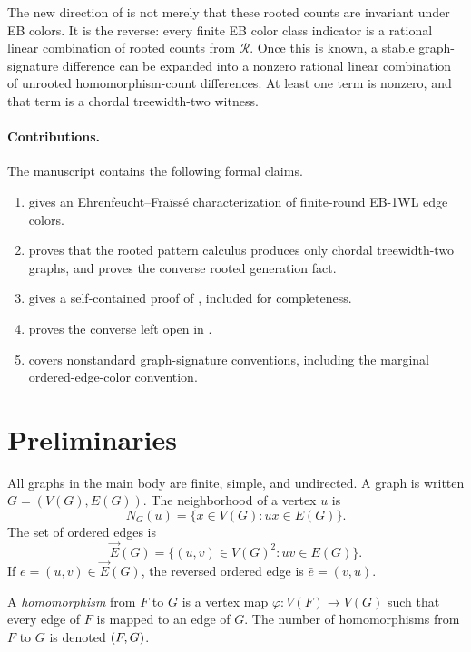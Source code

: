 \documentclass[11pt]{article}
\let\hom\relax
\DeclareMathOperator{\hom}{hom}
\newcommand{\cR}{\mathcal{R}}
\newcommand{\vecE}{\overrightarrow{E}}
\begin{document}
The new direction of  is not merely that these rooted counts are invariant under EB colors.  It is the reverse: every finite EB color class indicator is a rational linear combination of rooted counts from $\cR$.  Once this is known, a stable graph-signature difference can be expanded into a nonzero rational linear combination of unrooted homomorphism-count differences.  At least one term is nonzero, and that term is a chordal treewidth-two witness.

\paragraph{Contributions.}
The manuscript contains the following formal claims.
\begin{enumerate}[leftmargin=2.2em]
\item {} gives an Ehrenfeucht--Fra\"iss\'e characterization of finite-round EB-1WL edge colors.
\item {} proves that the rooted pattern calculus produces only chordal treewidth-two graphs, and  proves the converse rooted generation fact.
\item {} gives a self-contained proof of , included for completeness.
\item {} proves the converse left open in \cite{EBWL}.
\item {} covers nonstandard graph-signature conventions, including the marginal ordered-edge-color convention.
\end{enumerate}

\section{Preliminaries}

All graphs in the main body are finite, simple, and undirected.  A graph is written $G=(V(G),E(G))$.  The neighborhood of a vertex $u$ is
\[
N_G(u)=\{x\in V(G): ux\in E(G)\}.
\]
The set of ordered edges is
\[
\vecE(G)=\{(u,v)\in V(G)^2: uv\in E(G)\}.
\]
If $e=(u,v)\in\vecE(G)$, the reversed ordered edge is $\bar e=(v,u)$.

A \emph{homomorphism} from $F$ to $G$ is a vertex map $\varphi:V(F)\to V(G)$ such that every edge of $F$ is mapped to an edge of $G$.  The number of homomorphisms from $F$ to $G$ is denoted $\hom(F,G)$.
\end{document}
